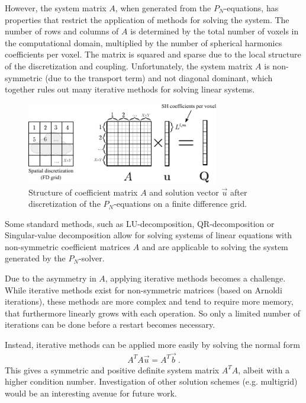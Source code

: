 However, the system matrix $A$, when generated from the $P_N$-equations, has properties that restrict the application of methods for solving the system. The number of rows and columns of $A$ is determined by the total number of voxels in the computational domain, multiplied by the number of spherical harmonics coefficients per voxel. The matrix is squared and sparse due to the local structure of the discretization and coupling. Unfortunately, the system matrix $A$ is non-symmetric (due to the transport term) and not diagonal dominant, which together rules out many iterative methods for solving linear systems.
\begin{figure}[h]
\centering
\includegraphics[width=0.75\textwidth]{04_pn_method/figures/fig_matrix_layout.pdf}
\caption{Structure of coefficient matrix $A$ and solution vector $\vec{u}$ after discretization of the $P_N$-equations on a finite difference grid.}
\label{fig:pn_matrix_layout}
\end{figure}

Some standard methods, such as LU-decomposition, QR-decomposition or Singular-value decomposition allow for solving systems of linear equations with non-symmetric coefficient matrices $A$ and are applicable to solving the system generated by the $P_N$-solver. 

Due to the asymmetry in $A$, applying iterative methods becomes a challenge. While iterative methods exist for non-symmetric matrices (based on Arnoldi iterations), these methods are more complex and tend to require more memory, that furthermore linearly grows with each operation. So only a limited number of iterations can be done before a restart becomes necessary.

Instead, iterative methods can be applied more easily by solving the normal form
\begin{align}
A^TA\vec{u} = A^T\vec{b}\ .
\end{align}
This gives a symmetric and positive definite system matrix $A^TA$, albeit with a higher condition number. Investigation of other solution schemes (e.g. multigrid) would be an interesting avenue for future work.

